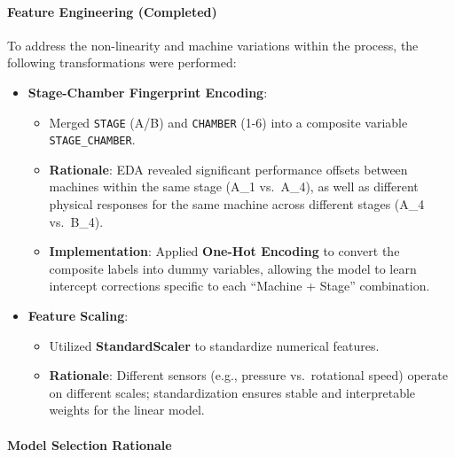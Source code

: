 \documentclass[11pt]{article}
\providecommand{\tightlist}{%
      \setlength{\itemsep}{0pt}\setlength{\parskip}{0pt}}
\begin{document}
    \paragraph{Feature Engineering
(Completed)}\label{feature-engineering-completed}

To address the non-linearity and machine variations within the process,
the following transformations were performed:

\begin{itemize}
\tightlist
\item
  \textbf{Stage-Chamber Fingerprint Encoding}:

  \begin{itemize}
  \tightlist
  \item
    Merged \texttt{STAGE} (A/B) and \texttt{CHAMBER} (1-6) into a
    composite variable \texttt{STAGE\_CHAMBER}.
  \item
    \textbf{Rationale}: EDA revealed significant performance offsets
    between machines within the same stage (A\_1 vs.~A\_4), as well as
    different physical responses for the same machine across different
    stages (A\_4 vs.~B\_4).
  \item
    \textbf{Implementation}: Applied \textbf{One-Hot Encoding} to
    convert the composite labels into dummy variables, allowing the
    model to learn intercept corrections specific to each ``Machine +
    Stage'' combination.
  \end{itemize}
\item
  \textbf{Feature Scaling}:

  \begin{itemize}
  \tightlist
  \item
    Utilized \textbf{StandardScaler} to standardize numerical features.
  \item
    \textbf{Rationale}: Different sensors (e.g., pressure vs.~rotational
    speed) operate on different scales; standardization ensures stable
    and interpretable weights for the linear model.
  \end{itemize}
\end{itemize}

    \paragraph{Model Selection Rationale}\label{model-selection-rationale}
\end{document}
